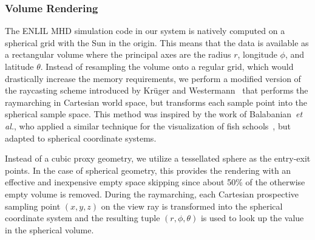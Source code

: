 \documentclass[journal]{vgtc}                %
\def\etal{\textit{et al.}}
\def\etal{\textit{et al.}}
\begin{document}
\subsubsection{Volume Rendering} \label{sec:volumerendering}
The ENLIL MHD simulation code in our system is natively computed on a spherical grid with the Sun in the origin. This means that the data is available as a rectangular volume where the principal axes are the radius $r$, longitude $\phi$, and latitude $\theta$. Instead of resampling the volume onto a regular grid, which would drastically increase the memory requirements, we perform a modified version of the raycasting scheme introduced by Kr\"uger and Westermann~\cite{Kruger:2003ge} that performs the raymarching in Cartesian world space, but transforms each sample point into the spherical sample space. This method was inspired by the work of Balabanian~\etal , who applied a similar technique for the visualization of fish schools~\cite{balabanian-2007-ant}, but adapted to spherical coordinate systems.

Instead of a cubic proxy geometry, we utilize a tessellated sphere as the entry-exit points. In the case of spherical geometry, this provides the rendering with an effective  and inexpensive empty space skipping since about 50\% of the otherwise empty volume is removed. During the raymarching, each Cartesian prospective sampling point $(x,y,z)$ on the view ray is transformed into the spherical coordinate system and the resulting tuple $(r, \phi, \theta)$ is used to look up the value in the spherical volume.
\end{document}

